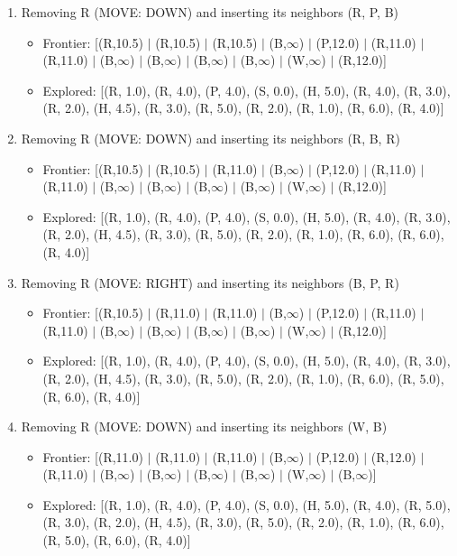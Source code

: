\documentclass[12pt]{article}
\begin{document}
\begin{enumerate}
\item Removing R (MOVE: DOWN) and inserting its neighbors (R, P, B)
\begin{itemize}
\item Frontier: [(R,10.5) \(|\) (R,10.5) \(|\) (R,10.5) \(|\) (B,\(\infty\)) \(|\) (P,12.0) \(|\) (R,11.0) \(|\) (R,11.0) \(|\) (B,\(\infty\)) \(|\) (B,\(\infty\)) \(|\) (B,\(\infty\)) \(|\) (B,\(\infty\)) \(|\) (W,\(\infty\)) \(|\) (R,12.0)]
\item Explored: [(R, 1.0), (R, 4.0), (P, 4.0), (S, 0.0), (H, 5.0), (R, 4.0), (R, 3.0), (R, 2.0), (H, 4.5), (R, 3.0), (R, 5.0), (R, 2.0), (R, 1.0), (R, 6.0), (R, 4.0)]
\end{itemize}

\item Removing R (MOVE: DOWN) and inserting its neighbors (R, B, R)
\begin{itemize}
\item Frontier: [(R,10.5) \(|\) (R,10.5) \(|\) (R,11.0) \(|\) (B,\(\infty\)) \(|\) (P,12.0) \(|\) (R,11.0) \(|\) (R,11.0) \(|\) (B,\(\infty\)) \(|\) (B,\(\infty\)) \(|\) (B,\(\infty\)) \(|\) (B,\(\infty\)) \(|\) (W,\(\infty\)) \(|\) (R,12.0)]
\item Explored: [(R, 1.0), (R, 4.0), (P, 4.0), (S, 0.0), (H, 5.0), (R, 4.0), (R, 3.0), (R, 2.0), (H, 4.5), (R, 3.0), (R, 5.0), (R, 2.0), (R, 1.0), (R, 6.0), (R, 6.0), (R, 4.0)]
\end{itemize}

\item Removing R (MOVE: RIGHT) and inserting its neighbors (B, P, R)
\begin{itemize}
\item Frontier: [(R,10.5) \(|\) (R,11.0) \(|\) (R,11.0) \(|\) (B,\(\infty\)) \(|\) (P,12.0) \(|\) (R,11.0) \(|\) (R,11.0) \(|\) (B,\(\infty\)) \(|\) (B,\(\infty\)) \(|\) (B,\(\infty\)) \(|\) (B,\(\infty\)) \(|\) (W,\(\infty\)) \(|\) (R,12.0)]
\item Explored: [(R, 1.0), (R, 4.0), (P, 4.0), (S, 0.0), (H, 5.0), (R, 4.0), (R, 3.0), (R, 2.0), (H, 4.5), (R, 3.0), (R, 5.0), (R, 2.0), (R, 1.0), (R, 6.0), (R, 5.0), (R, 6.0), (R, 4.0)]
\end{itemize}

\item Removing R (MOVE: DOWN) and inserting its neighbors (W, B)
\begin{itemize}
\item Frontier: [(R,11.0) \(|\) (R,11.0) \(|\) (R,11.0) \(|\) (B,\(\infty\)) \(|\) (P,12.0) \(|\) (R,12.0) \(|\) (R,11.0) \(|\) (B,\(\infty\)) \(|\) (B,\(\infty\)) \(|\) (B,\(\infty\)) \(|\) (B,\(\infty\)) \(|\) (W,\(\infty\)) \(|\) (B,\(\infty\))]
\item Explored: [(R, 1.0), (R, 4.0), (P, 4.0), (S, 0.0), (H, 5.0), (R, 4.0), (R, 5.0), (R, 3.0), (R, 2.0), (H, 4.5), (R, 3.0), (R, 5.0), (R, 2.0), (R, 1.0), (R, 6.0), (R, 5.0), (R, 6.0), (R, 4.0)]
\end{itemize}


\end{enumerate}
\end{document}
